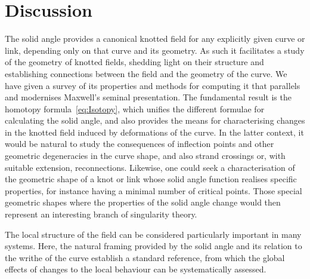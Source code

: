     \section{Discussion}
    \label{sec:discussion}

    The solid angle provides a canonical knotted field for any explicitly given curve or link, depending only on that curve and its geometry. As such it facilitates a study of the geometry of knotted fields, shedding light on their structure and establishing connections between the field and the geometry of the curve. 
    We have given a survey of its properties and methods for computing it that parallels and modernises Maxwell's seminal presentation. 
    The fundamental result is the homotopy formula~\eqref{eq:Isotopy}, which unifies the different formulae for calculating the solid angle, and also provides the means for characterising changes in the knotted field induced by deformations of the curve. In the latter context, it would be natural to study the consequences of inflection points and other geometric degeneracies in the curve shape, and also strand crossings or, with suitable extension, reconnections. Likewise, one could seek a characterisation of the geometric shape of a knot or link whose solid angle function realises specific properties, for instance having a minimal number of critical points. Those special geometric shapes where the properties of the solid angle change would then represent an interesting branch of singularity theory. 

    The local structure of the field can be considered particularly important in many systems. Here, the natural framing provided by the solid angle and its relation to the writhe of the curve establish a standard reference, from which the global effects of changes to the local behaviour can be systematically assessed. 

